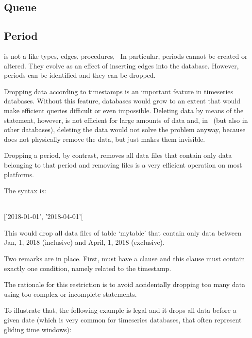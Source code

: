 \subsection{Queue}

\subsection{Period}
 is not a 
like types, edges, procedures, \etc\
In particular, periods cannot be created or altered.
They evolve as an effect of inserting edges into
the database. However, periods can be identified
and they can be dropped.

Dropping data according to timestamps is an important
feature in timeseries databases.
Without this feature, databases would grow
to an extent that would make efficient queries difficult
or even impossible. Deleting data by means of the
 statement, however, is not efficient for large
amounts of data and, in \nowdb\
(but also in other databases), deleting
the data would not solve the problem anyway,
because \term{delete} does not physically remove
the data, but just makes them invisible.

Dropping a period, by contrast, removes all data files 
that contain only data belonging to that period and
removing files is a very efficient
operation on most platforms.

The syntax is:

\begin{minipage}{\textwidth}
  \\
\keyword{where stamp between} $[$'2018-01-01', '2018-04-01'$[$
\end{minipage}

This would drop all data files of table `mytable'
that contain only data between Jan, 1, 2018 (inclusive) and
April, 1, 2018 (exclusive). 

Two remarks are in place. First,
 must have a  clause
and this clause must contain exactly one condition,
namely \keyword{between} related to the timestamp.

The rationale for this restriction is
to avoid accidentally dropping too many data
using too complex or incomplete  statements.

To illustrate that, the following example 
is legal and it drops all data
before a given date (which is very common
for timeseries databases, that often represent gliding
time windows):


